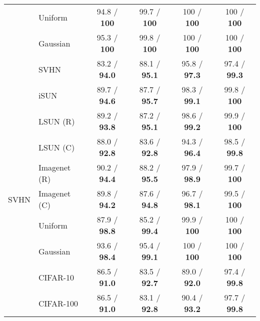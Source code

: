 \documentclass{article}
\begin{document}
\begin{table}[tbh]
\begin{tabular}{clcccc}
     & Uniform &   94.8 / \textbf{100} &   99.7 / \textbf{100} &    100 / \textbf{100} &    100 / \textbf{100} \\
     & Gaussian &   95.3 / \textbf{100} &   99.8 / \textbf{100} &    100 / \textbf{100} &    100 / \textbf{100} \\
     & SVHN &  83.2 / \textbf{94.0} &  88.1 / \textbf{95.1} &  95.8 / \textbf{97.3} &  97.4 / \textbf{99.3} \\
\midrule
\multirow{9}{*}{SVHN} & iSUN &  89.7 / \textbf{94.6} &  87.7 / \textbf{95.7} &  98.3 / \textbf{99.1} &   99.8 / \textbf{100} \\
     & LSUN (R) &  89.2 / \textbf{93.8} &  87.2 / \textbf{95.1} &  98.6 / \textbf{99.2} &   99.9 / \textbf{100} \\
     & LSUN (C) &  88.0 / \textbf{92.8} &  83.6 / \textbf{92.8} &  94.3 / \textbf{96.4} &  98.5 / \textbf{99.8} \\
     & Imagenet (R) &  90.2 / \textbf{94.4} &  88.2 / \textbf{95.5} &  97.9 / \textbf{98.9} &   99.7 / \textbf{100} \\
     & Imagenet (C) &  89.8 / \textbf{94.2} &  87.6 / \textbf{94.8} &  96.7 / \textbf{98.1} &   99.5 / \textbf{100} \\
     & Uniform &  87.9 / \textbf{98.8} &  85.2 / \textbf{99.4} &   99.9 / \textbf{100} &    100 / \textbf{100} \\
     & Gaussian &  93.6 / \textbf{98.4} &  95.4 / \textbf{99.1} &    100 / \textbf{100} &    100 / \textbf{100} \\
     & CIFAR-10 &  86.5 / \textbf{91.0} &  83.5 / \textbf{92.7} &  89.0 / \textbf{92.0} &  97.4 / \textbf{99.8} \\
     & CIFAR-100 &  86.5 / \textbf{91.0} &  83.1 / \textbf{92.8} &  90.4 / \textbf{93.2} &  97.7 / \textbf{99.8} \\
\bottomrule
\end{tabular}
 \end{table}
\end{document}
